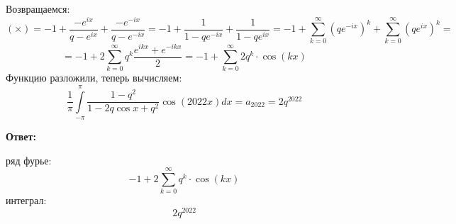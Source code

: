 \documentclass[a4paper,12pt]{article}
\begin{document}
Возвращаемся:
\[
(\times) = -1 + \frac{-e^{ix}}{q - e^{ix}} + \frac{-e^{-ix}}{q - e^{-ix}} = -1 + \frac{1}{1 - qe^{-ix}} + \frac{1}{1 - qe^{ix}} = -1 + \sum_{k = 0}^{\infty} \left( qe^{-ix} \right)^k + \sum_{k = 0}^{\infty} \left( qe^{ix} \right)^k   =
\]
\[
= -1 + 2\sum_{k = 0}^{\infty}  q^k \frac{e^{ikx} + e^{-ikx}}{2} = -1 + \sum_{k = 0}^{\infty} 2 q^k \cdot \cos (kx)
\]
Функцию разложили, теперь вычисляем:
\[
\frac{1}{\pi} \int\limits_{-\pi}^{\pi} \frac{1-q^2}{1-2q\cos x + q^2 } \cos (2022x)dx = a_{2022} =  2q^{2022}
\]
\begin{center}
\textbf{Ответ: } 

ряд фурье:
\[
-1 + 2 \sum_{k = 0}^{\infty} q^k \cdot \cos (kx)
\]
интеграл:
\[
2q^{2022}
\]
\end{center}
\end{document}
